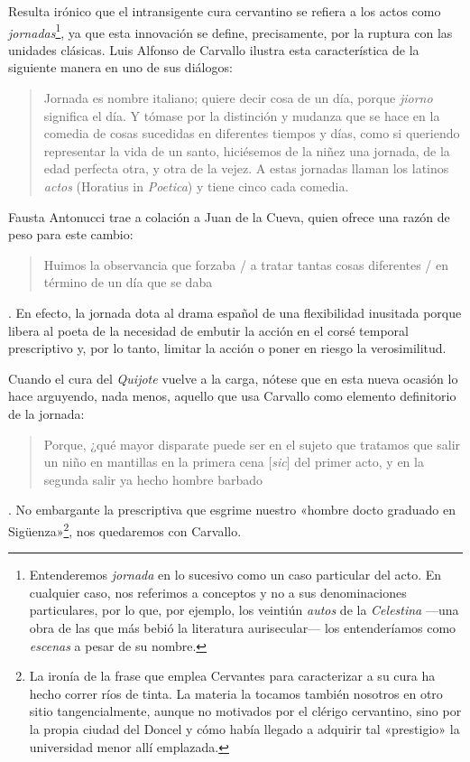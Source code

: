Resulta irónico que el intransigente cura cervantino se refiera a los actos como \textit{jornadas}\footnote{Entenderemos \textit{jornada} en lo sucesivo como un caso particular del acto. En cualquier caso, nos referimos a conceptos y no a sus denominaciones particulares, por lo que, por ejemplo, los veintiún \textit{autos} de la \textit{Celestina} —\nolinebreak una obra de las que más bebió la literatura aurisecular\nolinebreak— los entenderíamos como \textit{escenas} a pesar de su nombre.}, ya que esta innovación se define, precisamente, por la ruptura con las unidades clásicas. Luis Alfonso de Carvallo ilustra esta característica de la siguiente manera en uno de sus diálogos:

\blockquote{Jornada es nombre italiano; quiere decir cosa de un día, porque \textit{jiorno} significa el día. Y tómase por la distinción y mudanza que se hace en la comedia de cosas sucedidas en diferentes tiempos y días, como si queriendo representar la vida de un santo, hiciésemos de la niñez una jornada, de la edad perfecta otra, y otra de la vejez. A estas jornadas llaman los latinos \textit{actos} (Horatius in \textit{Poetica}) y tiene cinco cada comedia. \parencite[p. 261; énfasis en el original]{carvallo1997}}

Fausta Antonucci \parencite*[112]{antonucci2017} trae a colación a Juan de la Cueva, quien ofrece una razón de peso para este cambio: \blockquote{Huimos la
observancia que forzaba / a tratar tantas cosas diferentes / en término de un día que se daba} \parencite[en][144]{sanchez1972}. En efecto, la jornada dota al drama español de una flexibilidad inusitada porque libera al poeta de la necesidad de embutir la acción en el corsé temporal prescriptivo y, por lo tanto, limitar la acción o poner en riesgo la verosimilitud.

Cuando el cura del \textit{Quijote} vuelve a la carga, nótese que en esta nueva ocasión lo hace arguyendo, nada menos, aquello que usa Carvallo como elemento definitorio de la jornada: \blockquote{Porque, ¿qué mayor disparate puede ser en el sujeto que tratamos que salir un niño en mantillas en la primera cena [\textit{sic}] del primer acto, y en la segunda salir ya hecho hombre barbado} \parencite[624]{cervantes2016c}. No embargante la prescriptiva que esgrime nuestro «hombre docto graduado en Sigüenza»\footnote{La ironía de la frase que emplea Cervantes para caracterizar a su cura ha hecho correr ríos de tinta. La materia la tocamos también nosotros en otro sitio \parencite{sanz2022c,sanz2022a} tangencialmente, aunque no motivados por el clérigo cervantino, sino por la propia ciudad del Doncel y cómo había llegado a adquirir tal «prestigio» la universidad menor allí emplazada.}, nos quedaremos con Carvallo.

